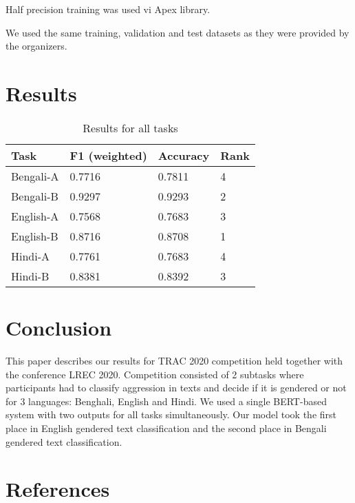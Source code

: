 \documentclass[10pt, a4paper]{article}
\begin{document}
Half precision training was used vi Apex library.

We used the same training, validation and test datasets as they were provided by the organizers.
\section{Results}
\label{sec:results}

\begin{table}[h]
\begin{tabular}{|llll|}
\hline
\bf Task & \bf F1 (weighted) & \bf Accuracy & \bf Rank\\ 
\hline
\hline
Bengali-A & 0.7716 & 0.7811 & 4\\  \hline
Bengali-B & 0.9297 & 0.9293 & 2\\  \hline
English-A & 0.7568 & 0.7683 & 3\\ \hline
English-B & 0.8716 & 0.8708 & 1\\ \hline
Hindi-A & 0.7761 & 0.7683 & 4\\  \hline
Hindi-B & 0.8381 & 0.8392 & 3\\  \hline
\end{tabular}
\caption{Results for all tasks}
\label{tab:results}
\end{table}

\section{Conclusion}
This paper describes our results for TRAC 2020 competition held together with the conference LREC 2020. Competition consisted of 2 subtasks where participants had to classify aggression in texts and decide if it is gendered or not for 3 languages: Benghali, English and Hindi. We used a single BERT-based system with two outputs for all tasks simultaneously. Our model took the first place in English gendered text classification and the second place in Bengali gendered text classification.

\section{References}


\end{document}
